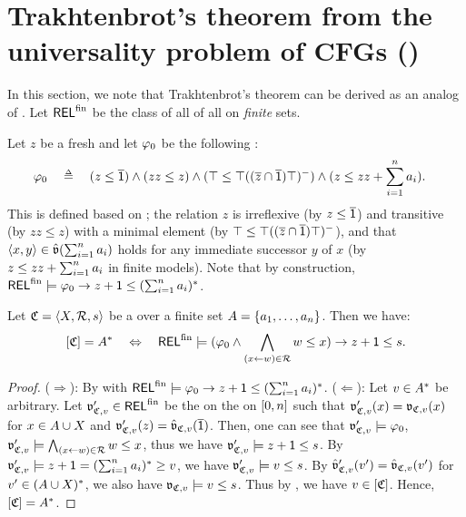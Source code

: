 \section{Trakhtenbrot's theorem from the universality problem of CFGs ()}\label{section: remark: Trakhtenbrot}
In this section, we note that Trakhtenbrot's theorem \cite{trakhtenbrotImpossibilityAlgorithmDecision1950} can be derived as an analog of .
Let $\mathsf{REL}^{\mathrm{fin}}$ be the class of all  of all  on \emph{finite} sets.

Let $z$ be a fresh  and let $\fml_0$ be the following :
\begin{align*}
    \fml_0 &\quad\defeq\quad (z \le \com{\id}) \land (z z \le z) \land (\top \le \top ((\com{z} \cap \com{\id}) \top)^{-})  \land (z \le zz \union \sum_{i = 1}^{n} a_i).
\end{align*}
This  is defined based on \cite[p.\ 30]{ebbinghausFiniteModelTheory1995};
the relation $z$ is irreflexive (by $z \le \overline{\mathsf{1}}$) and transitive (by $z z \le z$) with a minimal element (by $\top \le \top ((\overline{z} \cap \overline{\mathsf{1}}) \top)^{-}$),
and that $\langle x, y\rangle \in \hat{\mathfrak{v}}(\sum_{i = 1}^{n} a_i)$ holds for any immediate successor $y$ of $x$ (by $z \le zz \mathbin{+} \sum_{i = 1}^{n} a_i$ in finite models).
Note that by construction, $\REL^{\mathrm{fin}} \models \fml_0 \to z \union \id \le (\sum_{i = 1}^{n} a_i)^*$.

\begin{lemma}\label{lemma: CFG encoding lang Trakhten}
    Let $\mathfrak{C} = \langle X, \mathcal{R}, s\rangle$ be a  over a finite set $A = \{a_1, \dots, a_n\}$.
    Then we have:
    \[\ljump{\CFG} = \CSIG^* \quad\Leftrightarrow\quad \REL^{\mathrm{fin}} \models (\fml_0 \land \bigwedge_{(x \leftarrow w) \in \mathcal{R}} w \le x) \to z \union \id \le s.\]
\end{lemma}
\begin{proof}
    ($\Rightarrow$):
    By  with $\REL^{\mathrm{fin}} \models \fml_0 \to z \union \id \le (\sum_{i = 1}^{n} a_i)^*$.
    ($\Leftarrow$):
    Let $\word[2] \in \CSIG^*$ be arbitrary.
    Let $\val_{\CFG, \word[2]}' \in \REL^{\mathrm{fin}}$ be the  on the  on $[0, n]$ such that $\val_{\CFG, \word[2]}'(x) = \val_{\CFG, \word[2]}(x)$ for $x \in A \cup X$ and $\val_{\CFG, \word[2]}'(z) = \hat{\val}_{\CFG, \word[2]}(\com{\id})$. 
    Then, one can see that $\val_{\CFG, \word[2]}' \models \fml_0$,
    $\val_{\CFG, \word[2]}' \models \bigwedge_{(x \leftarrow w) \in \mathcal{R}} w \le x$, thus we have $\val_{\CFG, \word[2]}' \models z \union \id \le s$.
    By $\val_{\CFG, \word[2]}' \models z \union \id = (\sum_{i = 1}^{n} a_i)^* \ge \word[2]$, we have $\val_{\CFG, \word[2]}' \models \word[2] \le s$.
    By $\hat{\val}_{\CFG, \word[2]}'(\word[2]') = \hat{\val}_{\CFG, \word[2]}(\word[2]')$ for $\word[2]' \in (\CSIG \cup X)^*$, we also have $\val_{\CFG, \word[2]} \models \word[2] \le s$.
    Thus by , we have $\word[2] \in \ljump{\CFG}$.
    Hence, $[ \mathfrak{C} ] = A^*$.
\end{proof}

